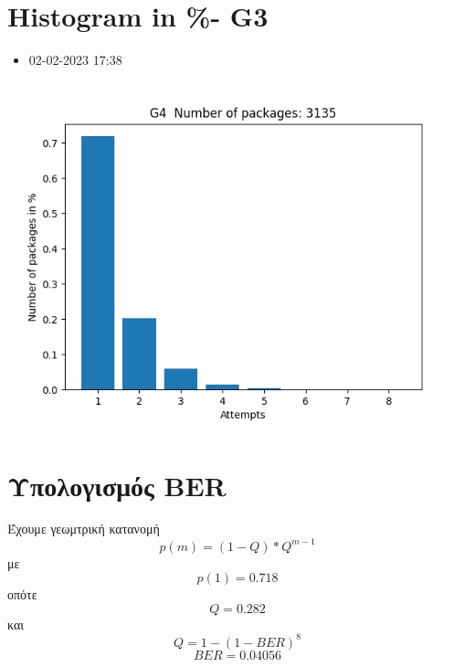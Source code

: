 \documentclass[10pt,a4paper]{article}
\begin{document}
\section*{\textlatin{Histogram in \%- G3}}
\begin{itemize}
  \item 02-02-2023 17:38
\end{itemize}
\begin{center}
  \includegraphics[scale=0.8]{G4.png}
  \newline
  \newline
  \newline
  \newline
\end{center}

\section*{Υπολογισμός \textlatin{BER}}
Έχουμε γεωμτρική κατανομή
\[p(m) = (1-Q)*Q^{m-1}\]
με
\[p(1) = 0.718\]
οπότε
\[Q = 0.282 \]
και
\[Q = 1 - (1 - BER)^8\]
\[BER = 0.04056 \]
\end{document}
